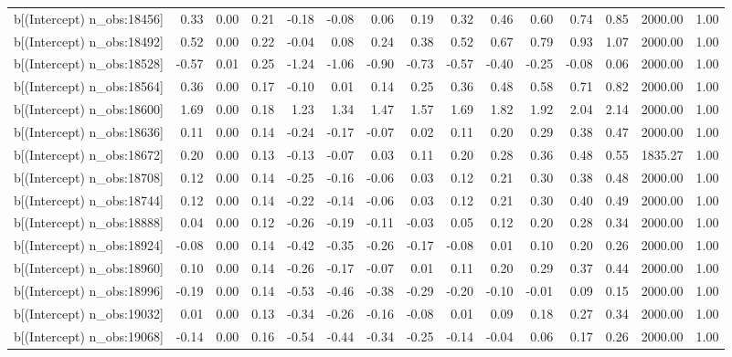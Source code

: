 \begin{table}[ht]
\begin{tabular}{rrrrrrrrrrrrrrr}
  b[(Intercept) n\_obs:18456] & 0.33 & 0.00 & 0.21 & -0.18 & -0.08 & 0.06 & 0.19 & 0.32 & 0.46 & 0.60 & 0.74 & 0.85 & 2000.00 & 1.00 \\ 
  b[(Intercept) n\_obs:18492] & 0.52 & 0.00 & 0.22 & -0.04 & 0.08 & 0.24 & 0.38 & 0.52 & 0.67 & 0.79 & 0.93 & 1.07 & 2000.00 & 1.00 \\ 
  b[(Intercept) n\_obs:18528] & -0.57 & 0.01 & 0.25 & -1.24 & -1.06 & -0.90 & -0.73 & -0.57 & -0.40 & -0.25 & -0.08 & 0.06 & 2000.00 & 1.00 \\ 
  b[(Intercept) n\_obs:18564] & 0.36 & 0.00 & 0.17 & -0.10 & 0.01 & 0.14 & 0.25 & 0.36 & 0.48 & 0.58 & 0.71 & 0.82 & 2000.00 & 1.00 \\ 
  b[(Intercept) n\_obs:18600] & 1.69 & 0.00 & 0.18 & 1.23 & 1.34 & 1.47 & 1.57 & 1.69 & 1.82 & 1.92 & 2.04 & 2.14 & 2000.00 & 1.00 \\ 
  b[(Intercept) n\_obs:18636] & 0.11 & 0.00 & 0.14 & -0.24 & -0.17 & -0.07 & 0.02 & 0.11 & 0.20 & 0.29 & 0.38 & 0.47 & 2000.00 & 1.00 \\ 
  b[(Intercept) n\_obs:18672] & 0.20 & 0.00 & 0.13 & -0.13 & -0.07 & 0.03 & 0.11 & 0.20 & 0.28 & 0.36 & 0.48 & 0.55 & 1835.27 & 1.00 \\ 
  b[(Intercept) n\_obs:18708] & 0.12 & 0.00 & 0.14 & -0.25 & -0.16 & -0.06 & 0.03 & 0.12 & 0.21 & 0.30 & 0.38 & 0.48 & 2000.00 & 1.00 \\ 
  b[(Intercept) n\_obs:18744] & 0.12 & 0.00 & 0.14 & -0.22 & -0.14 & -0.06 & 0.03 & 0.12 & 0.21 & 0.30 & 0.40 & 0.49 & 2000.00 & 1.00 \\ 
  b[(Intercept) n\_obs:18888] & 0.04 & 0.00 & 0.12 & -0.26 & -0.19 & -0.11 & -0.03 & 0.05 & 0.12 & 0.20 & 0.28 & 0.34 & 2000.00 & 1.00 \\ 
  b[(Intercept) n\_obs:18924] & -0.08 & 0.00 & 0.14 & -0.42 & -0.35 & -0.26 & -0.17 & -0.08 & 0.01 & 0.10 & 0.20 & 0.26 & 2000.00 & 1.00 \\ 
  b[(Intercept) n\_obs:18960] & 0.10 & 0.00 & 0.14 & -0.26 & -0.17 & -0.07 & 0.01 & 0.11 & 0.20 & 0.29 & 0.37 & 0.44 & 2000.00 & 1.00 \\ 
  b[(Intercept) n\_obs:18996] & -0.19 & 0.00 & 0.14 & -0.53 & -0.46 & -0.38 & -0.29 & -0.20 & -0.10 & -0.01 & 0.09 & 0.15 & 2000.00 & 1.00 \\ 
  b[(Intercept) n\_obs:19032] & 0.01 & 0.00 & 0.13 & -0.34 & -0.26 & -0.16 & -0.08 & 0.01 & 0.09 & 0.18 & 0.27 & 0.34 & 2000.00 & 1.00 \\ 
  b[(Intercept) n\_obs:19068] & -0.14 & 0.00 & 0.16 & -0.54 & -0.44 & -0.34 & -0.25 & -0.14 & -0.04 & 0.06 & 0.17 & 0.26 & 2000.00 & 1.00 \\ 

\end{tabular}
\end{table}
